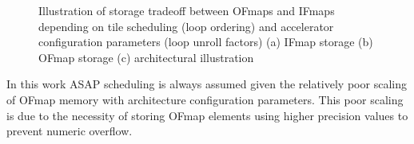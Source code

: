\begin{figure}
    \centering
    \hspace{0.1cm} 
    \caption{Illustration of storage tradeoff between OFmaps and IFmaps depending on tile scheduling (loop ordering) and accelerator configuration parameters (loop unroll factors) (a) IFmap storage (b) OFmap storage (c) architectural illustration}
    \label{fig:Fmap_scaling}
\end{figure}

In this work ASAP scheduling is always assumed given the relatively poor scaling
of OFmap memory with architecture configuration parameters. This poor scaling is due
to the necessity of storing OFmap elements using higher precision values to
prevent numeric overflow. 